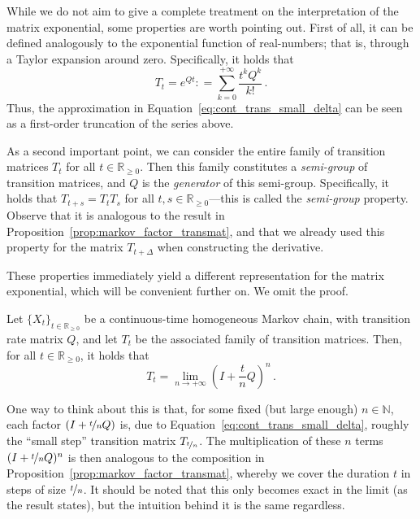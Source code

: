 \documentclass[graybox]{svmult}
\newcommand{\nats}{\mathbb{N}}
\newcommand{\reals}{\mathbb{R}}
\newcommand{\realsnonneg}{\reals_{\geq 0}}
\newcommand{\coloneqq}{:\!=}
\begin{document}
While we do not aim to give a complete treatment on the interpretation of the matrix exponential, some properties are worth pointing out. First of all, it can be defined analogously to the exponential function of real-numbers; that is, through a Taylor expansion around zero. Specifically, it holds that
\begin{equation*}
T_t = e^{Qt} \coloneqq \sum_{k=0}^{+\infty} \frac{t^kQ^k}{k!}\,.
\end{equation*}
Thus, the approximation in Equation~\eqref{eq:cont_trans_small_delta} can be seen as a first-order truncation of the series above.

As a second important point, we can consider the entire family of transition matrices $T_t$ for all $t\in\realsnonneg$. Then this family constitutes a \emph{semi-group} of transition matrices, and $Q$ is the \emph{generator} of this semi-group. Specifically, it holds that $T_{t+s}=T_tT_s$ for all $t,s\in\realsnonneg$---this is called the \emph{semi-group} property. Observe that it is analogous to the result in Proposition~\ref{prop:markov_factor_transmat}, and that we already used this property for the matrix $T_{t+\Delta}$ when constructing the derivative.

These properties immediately yield a different representation for the matrix exponential, which will be convenient further on. We omit the proof.
\begin{proposition}\label{prop:matrix_exp_convenient_steps}
Let $\{X_t\}_{t\in\realsnonneg}$ be a continuous-time homogeneous Markov chain, with transition rate matrix $Q$, and let $T_t$ be the associated family of transition matrices. Then, for all $t\in\realsnonneg$, it holds that
\begin{equation*}
T_t = \lim_{n\to+\infty} \left(I+\frac{t}{n}Q\right)^n\,.
\end{equation*}
\end{proposition}
One way to think about this is that, for some fixed (but large enough) $n\in\nats$, each factor $(I+\nicefrac{t}{n}Q)$ is, due to Equation~\eqref{eq:cont_trans_small_delta}, roughly the ``small step'' transition matrix $T_{\nicefrac{t}{n}}$. The multiplication of these $n$ terms $(I+\nicefrac{t}{n}Q)^n$ is then analogous to the composition in Proposition~\ref{prop:markov_factor_transmat}, whereby we cover the duration $t$ in steps of size $\nicefrac{t}{n}$. It should be noted that this only becomes exact in the limit (as the result states), but the intuition behind it is the same regardless.
\end{document}
